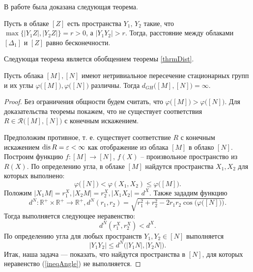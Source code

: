 В работе \cite{nesterov2025gromovhausdorffdistancecloudbounded} была
доказана следующая теорема.
\begin{thm}
  Пусть в облаке \( [Z] \) есть пространства $Y_{1}$, $ Y_{2}$ такие,
  что \\$\max\big\{ |Y_{1}Z|, |Y_{2} Z| \big\} = r>0$, а $|Y_{1}
  Y_{2}|>r$. Тогда, расстояние между облаками $[\Delta_1]$ и $[Z]$
  равно бесконечности. \label{thrmDist}
\end{thm}
Следующая теорема является обобщением теоремы \ref{thrmDist}.
\begin{thm}
  Пусть облака \( [M], [N] \) имеют нетривиальное пересечение
  стационарных групп и их углы \( \varphi \big([M]\big), \varphi
  \big([N]\big) \) различны. Тогда \( d_{GH} \big([M], [N]\big) =
  \infty \).
\end{thm}
\begin{proof}
  Без ограничения общности будем считать, что \( \varphi \big([M]\big)>
  \varphi \big([N]\big) \). Для доказательства теоремы покажем, что не
  существует соответствия \( R\in \mathcal{R}\big([M],[N]\big) \) с
  конечным искажением.

  Предположим противное, т. е. существует соответствие \( R \) с
  конечным искажением \( \operatorname{dis} R = \varepsilon < \infty \) как
  отображение из облака \( [M] \) в облако \( [N] \). Построим функцию
  \( f \colon [M] \rightarrow [N] \), \( f(X) \) -- произвольное
  пространство из \(
    R(X)
  \). По определению угла, в облаке \( [M] \) найдутся пространства \(
  X_1, X_2 \) для которых выполнено:
  \[
    \varphi \big([N]\big) < \varphi (X_1, X_2) \le \varphi
  \big([M]\big). \]
  Положим \( |X_1 M| = r_1^X,  |X_2 M| = r_2^X, | X_1 X_2 | = d^X\).
  Также зададим функцию
  \[ d^N \colon \mathbb{R}^+ \times \mathbb{R}^+ \rightarrow
    \mathbb{R}^+, d^N(r_1, r_2) =
    \sqrt{r_1^2 + r_2^2 - 2r_1r_2\cos\Big(\varphi \big([N]\big)\Big)}.
  \]
  Тогда выполняется следующее неравенство:
  \begin{equation}
    d^N(r_1^X, r_2^X) < d^X.
    \label{ineqdx}
  \end{equation}
  По определению угла для любых пространств \( Y_1, Y_2 \in [N] \)
  выполняется
  \begin{equation}
    | Y_1 Y_2 | \le d^N\big(| Y_1N |, | Y_2N |\big). \label{ineqAngle}
  \end{equation}
  Итак, наша задача --- показать, что найдутся пространства в \( [N]
  \), для которых неравенство (\ref{ineqAngle}) не выполняется.


\end{proof}

